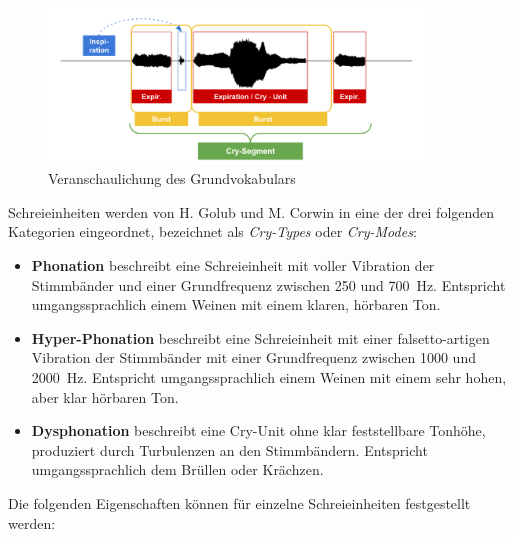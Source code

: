 \begin{figure}[H]
	\centering
	\includegraphics[width=0.9\textwidth]{bilder/cryVoc02.png}
	\caption{Veranschaulichung des Grundvokabulars}
	\label{img:cryVocabulary}
\end{figure}

Schreieinheiten werden von H. Golub und M. Corwin in eine der drei folgenden Kategorien eingeordnet, bezeichnet als \emph{Cry-Types} oder \emph{Cry-Modes}:

\begin{itemize}
	\item \textbf{Phonation} beschreibt eine Schreieinheit mit \glqq voller Vibration der Stimmbänder\grqq{} und einer Grundfrequenz zwischen 250 und \SI{700}{\hertz}. Entspricht umgangssprachlich einem Weinen mit einem \glqq klaren, hörbaren Ton\grqq{}.
	\item \textbf{Hyper-Phonation} beschreibt eine Schreieinheit mit einer \glqq falsetto-artigen Vibration der Stimmbänder\grqq{} mit einer Grundfrequenz zwischen 1000 und \SI{2000}{\hertz}. Entspricht umgangssprachlich einem Weinen mit einem \glqq sehr hohen, aber klar hörbaren Ton\grqq{}.
	\item \textbf{Dysphonation} beschreibt eine Cry-Unit ohne klar feststellbare Tonhöhe, produziert durch Turbulenzen an den Stimmbändern. Entspricht umgangssprachlich dem \glqq Brüllen oder Krächzen\grqq{}.\cite[S. 61 - 62]{cryModel}
\end{itemize}

Die folgenden Eigenschaften können für einzelne Schreieinheiten festgestellt werden:

